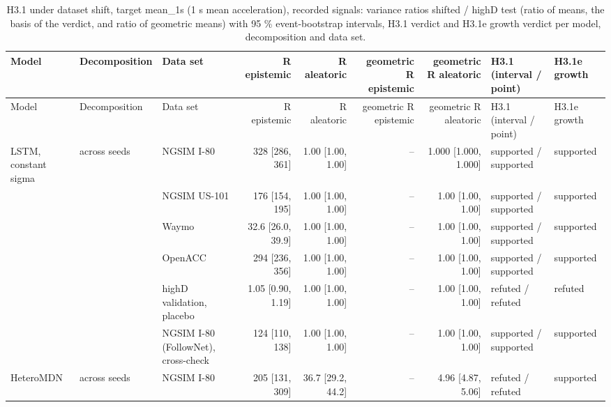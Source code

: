 \begingroup
\footnotesize
\begin{longtable}{lllrrrrll}
\caption{H3.1 under dataset shift, target mean\_1s (1 s mean acceleration), recorded signals: variance ratios shifted / highD test (ratio of means, the basis of the verdict, and ratio of geometric means) with 95 \% event-bootstrap intervals, H3.1 verdict and H3.1e growth verdict per model, decomposition and data set.}\label{tab:t2-h31--raw--mean-1s} \\
\toprule
Model & Decomposition & Data set & R epistemic & R aleatoric & geometric R epistemic & geometric R aleatoric & H3.1 (interval / point) & H3.1e growth \\
\midrule
\endfirsthead
\toprule
Model & Decomposition & Data set & R epistemic & R aleatoric & geometric R epistemic & geometric R aleatoric & H3.1 (interval / point) & H3.1e growth \\
\midrule
\endhead
\bottomrule
\endlastfoot
LSTM, constant sigma & across seeds & NGSIM I-80 & 328 [286, 361] & 1.00 [1.00, 1.00] & -- & 1.000 [1.000, 1.000] & supported / supported & supported \\
 &  & NGSIM US-101 & 176 [154, 195] & 1.00 [1.00, 1.00] & -- & 1.00 [1.00, 1.00] & supported / supported & supported \\
 &  & Waymo & 32.6 [26.0, 39.9] & 1.00 [1.00, 1.00] & -- & 1.00 [1.00, 1.00] & supported / supported & supported \\
 &  & OpenACC & 294 [236, 356] & 1.00 [1.00, 1.00] & -- & 1.00 [1.00, 1.00] & supported / supported & supported \\
 &  & highD validation, placebo & 1.05 [0.90, 1.19] & 1.00 [1.00, 1.00] & -- & 1.00 [1.00, 1.00] & refuted / refuted & refuted \\
 &  & NGSIM I-80 (FollowNet), cross-check & 124 [110, 138] & 1.00 [1.00, 1.00] & -- & 1.00 [1.00, 1.00] & supported / supported & supported \\
\midrule
HeteroMDN & across seeds & NGSIM I-80 & 205 [131, 309] & 36.7 [29.2, 44.2] & -- & 4.96 [4.87, 5.06] & refuted / refuted & supported \\

\end{longtable}
